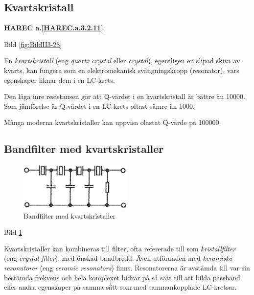 \subsection{Kvartskristall}

\textbf{HAREC a.\ref{HAREC.a.3.2.11}\label{myHAREC.a.3.2.11}}

Bild \ref{fig:BildII3-28}

En \emph{kvartskristall} (eng \emph{quartz crystal} eller \emph{crystal}),
egentligen en slipad skiva av kvarts, kan fungera som en
elektromekanisk svängningskropp (resonator), vars egenskaper liknar dem i en
LC-krets.

Den låga inre resistansen gör att Q-värdet i en kvartskristall är bättre än
10000. Som jämförelse är Q-värdet i en LC-krets oftast sämre än 1000.

Många moderna kvartskristaller kan uppvisa olastat Q-värde på 100000.

\vspace{12pt} %

\subsection{Bandfilter med kvartskristaller}

\begin{figure}
\includegraphics[width=0.5\textwidth]{images/cropped_pdfs/bild_2_3-29.pdf}
\caption{Bandfilter med kvartskristaller}
\label{fig:BildII3-29}
\end{figure}

Bild \ref{fig:BildII3-29}

Kvartskristaller kan kombineras till filter, ofta refererade till som
\emph{kristallfilter} (eng \emph{crystal filter}), med önskad bandbredd. Även
utföranden med \emph{keramiska resonatorer} (eng \emph{ceramic resonators})
finns. Resonatorerna är avstämda till var sin bestämda frekvens och hela
komplexet bidrar på så sätt till att bilda passband eller andra egenskaper på
samma sätt som med sammankopplade LC-kretsar.


